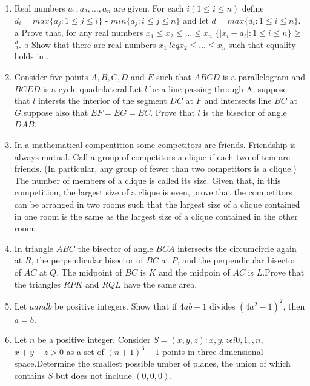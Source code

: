 \documentclass[12pt,-letter paper]{article}                           \usepackage{gvv}
\begin{document}
\begin{enumerate}
\item Real numbers $a_{1}, a_{2}, \dots, a_{n}$ are given. For each $i(1 \leq i \leq n)$ define 
	$d_{i}=max \{a_{j} : 1 \leq j \leq i\}$ - $min\{a_{j} : i \leq j \leq n\}$ and let 
$d = max\{d_i : 1 \leq i \leq n\}$.
\brak a Prove that, for any real numbers $x_{1} \leq x_{2} \leq \dots \leq x_{n}$
$\{ | x_{i} - a_{i} | : 1 \leq  i \leq n \} \geq$  $\frac {d}{2}$. \brak * 
\brak b Show that there are real numbers $x_{1} \ leq x_{2} \leq \dots \leq x_{n}$ such that equality     holds in \brak *.
\item Consider five points $A,B,C,D$ and $E$ such that $ABCD$ is a parallelogram and $BCED$ is a cycle quadrilateral.Let $l$ be a line passing through A. suppose that $l$ intersts the interior of the segment $DC$ at $F$ and intersects line $BC$ at $G$.suppose also that $EF=EG=EC$. Prove that $l$ is the bisector of angle $DAB$.
\item In a mathematical compentition some competitors are friends. Friendship is always mutual. Call a group of competitors a clique if each two of tem are friends. (In particular, any group of fewer than two competitors is a clique.) The number of members of a clique is called its size.
	Given that, in this competition, the largest size of a clique is even, prove that the competitors can be arranged in two rooms such that the largest size of a clique contained in one room is the same as the largest size of a clique contained in the other room.
\item In triangle $ABC$ the bisector of angle $BCA$ intersects the circumcircle again at $R$, the perpendicular bisector of $BC$ at $P$, and the perpendicular bisector of $AC$ at $Q$. The midpoint of $BC$ is $K$ and the midpoin of $AC$ is $L$.Prove that the triangles $RPK$ and $RQL$ have the same area.
\item Let $a and b$ be positive integers. Show that if $4ab-1$ divides $(4a^2-1)^2$, then $a=b$.
\item Let $n$ be a positive integer. Consider
	$S={(x,y,z)} : {x,y,z} \epsilon i{0,1,\dot,n}$, ${x+y+z>0}$ 
		as a set of $(n+1)^{3}-1$ points in three-dimensional space.Determine the smallest possible umber of planes, the union of which contains $S$ but does not include $(0,0,0)$.
\end{enumerate}
\end{document}

